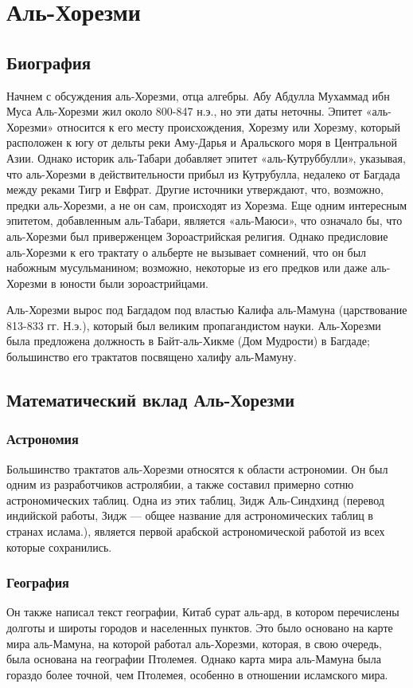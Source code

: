 \section{Аль-Хорезми}
\subsection{Биография}
Начнем с обсуждения аль-Хорезми, отца алгебры. Абу Абдулла Мухаммад ибн Муса Аль-Хорезми жил около 800-847 н.э., но эти даты неточны. Эпитет «аль-Хорезми» относится к его месту происхождения, Хорезму или Хорезму, который расположен к югу от дельты реки Аму-Дарья и Аральского моря в Центральной Азии. Однако историк аль-Табари добавляет эпитет «аль-Кутруббулли», указывая, что аль-Хорезми в действительности прибыл из Кутрубулла, недалеко от Багдада между реками Тигр и Евфрат. Другие источники утверждают, что, возможно, предки аль-Хорезми, а не он сам, происходят из Хорезма. Еще одним интересным эпитетом, добавленным аль-Табари, является «аль-Маюси», что означало бы, что аль-Хорезми был приверженцем Зороастрийская религия. Однако предисловие аль-Хорезми к его трактату о альберте не вызывает сомнений, что он был набожным мусульманином; возможно, некоторые из его предков или даже аль-Хорезми в юности были зороастрийцами.

Аль-Хорезми вырос под Багдадом под властью Калифа аль-Мамуна (царствование 813-833 гг. Н.э.), который был великим пропагандистом науки. Аль-Хорезми была предложена должность в Байт-аль-Хикме (Дом Мудрости) в Багдаде; большинство его трактатов посвящено халифу аль-Мамуну.

\subsection{Математический вклад Аль-Хорезми}
\subsubsection{Астрономия}
Большинство трактатов аль-Хорезми относятся к области астрономии. Он был одним из разработчиков астролябии, а также составил примерно сотню астрономических таблиц. Одна из этих таблиц, Зидж Аль-Синдхинд (перевод индийской работы, Зидж — общее название для астрономических таблиц в странах ислама.), является первой арабской астрономической работой из всех которые сохранились. 

\subsubsection{География}
Он также написал текст географии, Китаб сурат аль-ард, в котором перечислены долготы и широты городов и населенных пунктов. Это было основано на карте мира аль-Мамуна, на которой работал аль-Хорезми, которая, в свою очередь, была основана на географии Птолемея. Однако карта мира аль-Мамуна была гораздо более точной, чем Птолемея, особенно в отношении исламского мира.

